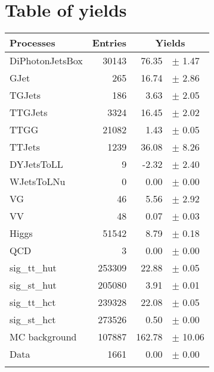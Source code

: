 \clearpage
\chapter{Table of yields}

{\renewcommand{\arraystretch}{1.0}
\begin{center}
\begin{tabular}{lrrl}
\hline\hline
Processes & Entries &\multicolumn{2}{c}{Yields}\\
\hline\hline
DiPhotonJetsBox  & 	           30143 & 	           76.35 & $\pm$ 	       1.47\\
GJet		 & 	             265 & 	           16.74 & $\pm$ 	       2.86\\
TGJets		 & 	             186 & 	            3.63 & $\pm$ 	       2.05\\
TTGJets		 & 	            3324 & 	           16.45 & $\pm$ 	       2.02\\
TTGG		 & 	           21082 & 	            1.43 & $\pm$ 	       0.05\\
TTJets		 & 	            1239 & 	           36.08 & $\pm$ 	       8.26\\
DYJetsToLL	 & 	               9 & 	           -2.32 & $\pm$ 	       2.40\\
WJetsToLNu	 & 	               0 & 	            0.00 & $\pm$ 	       0.00\\
VG		 & 	              46 & 	            5.56 & $\pm$ 	       2.92\\
VV		 & 	              48 & 	            0.07 & $\pm$ 	       0.03\\
Higgs		 & 	           51542 & 	            8.79 & $\pm$ 	       0.18\\
QCD		 & 	               3 & 	            0.00 & $\pm$ 	       0.00\\
sig\_tt\_hut	 & 	          253309 & 	           22.88 & $\pm$ 	       0.05\\
sig\_st\_hut	 & 	          205080 & 	            3.91 & $\pm$ 	       0.01\\
sig\_tt\_hct	 & 	          239328 & 	           22.08 & $\pm$ 	       0.05\\
sig\_st\_hct	 & 	          273526 & 	            0.50 & $\pm$ 	       0.00\\
\hline
MC background	 & 	          107887 & 	          162.78 & $\pm$ 	      10.06\\
Data		 & 	            1661 & 	            0.00 & $\pm$ 	       0.00\\
\hline\hline\\
\end{tabular}
\end{center}
}

